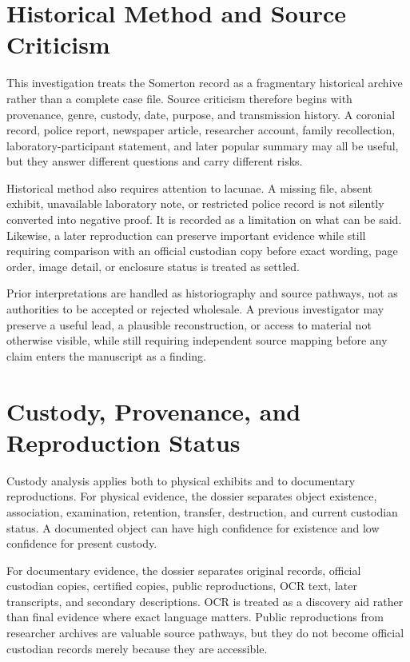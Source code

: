 \section{Historical Method and Source Criticism}

This investigation treats the Somerton record as a fragmentary historical archive rather than a complete case file. Source criticism therefore begins with provenance, genre, custody, date, purpose, and transmission history. A coronial record, police report, newspaper article, researcher account, family recollection, laboratory-participant statement, and later popular summary may all be useful, but they answer different questions and carry different risks.

Historical method also requires attention to lacunae. A missing file, absent exhibit, unavailable laboratory note, or restricted police record is not silently converted into negative proof. It is recorded as a limitation on what can be said. Likewise, a later reproduction can preserve important evidence while still requiring comparison with an official custodian copy before exact wording, page order, image detail, or enclosure status is treated as settled.

Prior interpretations are handled as historiography and source pathways, not as authorities to be accepted or rejected wholesale. A previous investigator may preserve a useful lead, a plausible reconstruction, or access to material not otherwise visible, while still requiring independent source mapping before any claim enters the manuscript as a finding.

\section{Custody, Provenance, and Reproduction Status}

Custody analysis applies both to physical exhibits and to documentary reproductions. For physical evidence, the dossier separates object existence, association, examination, retention, transfer, destruction, and current custodian status. A documented object can have high confidence for existence and low confidence for present custody.

For documentary evidence, the dossier separates original records, official custodian copies, certified copies, public reproductions, OCR text, later transcripts, and secondary descriptions. OCR is treated as a discovery aid rather than final evidence where exact language matters. Public reproductions from researcher archives are valuable source pathways, but they do not become official custodian records merely because they are accessible.

